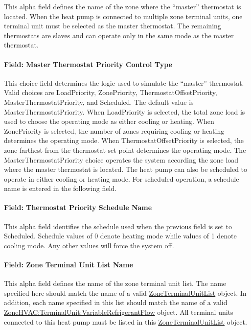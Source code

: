 This alpha field defines the name of the zone where the ``master'' thermostat is located. When the heat pump is connected to multiple zone terminal units, one terminal unit must be selected as the master thermostat. The remaining thermostats are slaves and can operate only in the same mode as the master thermostat.

\paragraph{Field: Master Thermostat Priority Control Type}\label{field-master-thermostat-priority-control-type-000}

This choice field determines the logic used to simulate the ``master'' thermostat. Valid choices are LoadPriority, ZonePriority, ThermostatOffsetPriority, MasterThermostatPriority, and Scheduled. The default value is MasterThermostatPriority. When LoadPriority is selected, the total zone load is used to choose the operating mode as either cooling or heating. When ZonePriority is selected, the number of zones requiring cooling or heating determines the operating mode. When ThermostatOffsetPriority is selected, the zone farthest from the thermostat set point determines the operating mode. The MasterThermostatPriority choice operates the system according the zone load where the master thermostat is located. The heat pump can also be scheduled to operate in either cooling or heating mode. For scheduled operation, a schedule name is entered in the following field.

\paragraph{Field: Thermostat Priority Schedule Name}\label{field-thermostat-priority-schedule-name-000}

This alpha field identifies the schedule used when the previous field is set to Scheduled. Schedule values of 0 denote heating mode while values of 1 denote cooling mode. Any other values will force the system off.

\paragraph{Field: Zone Terminal Unit List Name}\label{field-zone-terminal-unit-list-name}

This alpha field defines the name of the zone terminal unit list. The name specified here should match the name of a valid \hyperref[zoneterminalunitlist]{ZoneTerminalUnitList} object. In addition, each name specified in this list should match the name of a valid \hyperref[zonehvacterminalunitvariablerefrigerantflow]{ZoneHVAC:TerminalUnit:VariableRefrigerantFlow} object. All terminal units connected to this heat pump must be listed in this \hyperref[zoneterminalunitlist]{ZoneTerminalUnitList} object.

